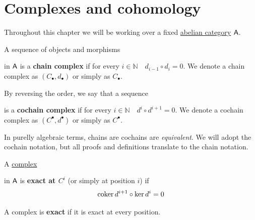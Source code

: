 \documentclass[../../../main]{subfiles}
\begin{document}
\section{Complexes and cohomology}

Throughout this chapter we will be working over a fixed \hyperref[def:abelian-category]{abelian category} \(\mathsf{A}\).

\begin{definition}[Complex] \label{def:complex}
  A sequence of objects and morphisms
  \begin{center}
  \end{center}
  in \(\mathsf{A}\) is a \textbf{chain complex} if for every \(i \in \mathbb{N} \quad d_{i-1} \circ d_{i} = 0\).
  We denote a chain complex as \((C_{\bullet}, d_{\bullet})\) or simply as \(C_{\bullet}\).

  By reversing the order, we say that a sequence
  \begin{center}
  \end{center}
  is a \textbf{cochain complex} if for every \(i \in \mathbb{N} \quad d^{i} \circ d^{i+1} = 0\).
  We denote a cochain complex as \((C^{\bullet}, d^{\bullet})\) or simply as \(C^{\bullet}\).
\end{definition}

\begin{remark}
  In purelly algebraic terms, chains are cochains are \textit{equivalent}.
  We will adopt the cochain notation, but all proofs and definitions translate to the chain notation.
\end{remark}


\begin{definition} \label{def:exact-complex}
  A \hyperref[def:complex]{complex}
  \begin{center}
  \end{center}
  in \(\mathsf{A}\) is \textbf{exact at \(C^{i}\)} (or simply at position \(i\)) if
  \begin{equation*}
    \operatorname*{coker} d^{i+1} \circ \ker d^{i} = 0
  \end{equation*}

  A complex is \textbf{exact} if it is exact at every position.
\end{definition}
\end{document}

